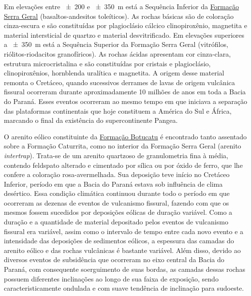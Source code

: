 \def\serrageral{\href{http://pt.wikipedia.org/wiki/Forma\%C3\%A7\%C3\%A3o_Serra_Geral}{Formação Serra Geral}}

Em elevações entre \num{\pm200} e \SI{\pm350}{\metre} está a Sequência Inferior da \serrageral{} 
(basaltos-andesitos toleíticos). As rochas básicas são de coloração cinza-escura e são constituídas por 
plagioclásio cálcico clinopiroxênio, magnetita e material intersticial de quartzo e material desvitrificado. 
Em elevações superiores a \SI{\pm350}{\metre} está a Sequência Superior da Formação Serra Geral (vitrófilos, 
riólitos-riodacitos granofíricos). As rochas ácidas apresentam cor cinza-clara, estrutura microcristalina e 
são constituídas por cristais e plagioclásio, clinopiroxênios, hornblenda uralítica e magnetita. A origem 
desse material remonta o Cretáceo, quando sucessivos derrames de lavas de origem vulcânica fissural ocorreram 
durante aproximadamente \num{10} milhões de anos em toda a Bacia do Paraná. Esses eventos ocorreram ao mesmo 
tempo em que iniciava a separação das plataformas continentais que hoje constituem a América do Sul e África, 
marcando o final da existência do supercontinente Pangea.

\def\botucatu{\href{http://pt.wikipedia.org/wiki/Forma\%C3\%A7\%C3\%A3o_Botucatu}{Formação Botucatu}}

O arenito eólico constituinte da \botucatu{} é encontrado tanto assentado sobre a Formação Caturrita, como no 
interior da Formação Serra Geral (arenito \emph{intertrap}). Trata-se de um arenito quartzoso de granulometria 
fina à média, contendo feldspato alterado e cimentado por sílica ou por óxido de ferro, que lhe confere a 
coloração rosa-avermelhada. Sua deposição teve início no Cretáceo Inferior, período em que a Bacia do Paraná 
estava sob influência de clima desértico. Essa condição climática continuou durante todo o período em que 
ocorreram as dezenas de eventos de vulcanismo fissural, fazendo com que os mesmos fossem sucedidos por 
deposições eólicas de duração variável. Como a duração e a quantidade de material depositado pelos eventos de 
vulcanismo fissural era variável, assim como o intervalo de tempo entre cada novo evento e a intensidade das 
deposições de sedimentos eólicos, a espessura das camadas do arenito eólico e das rochas vulcânicas é bastante 
variável. Além disso, devido ao diversos eventos de subsidência que ocorreram no eixo central da Bacia do 
Paraná, com consequente soerguimento de suas bordas, as camadas dessas rochas possuem diferentes inclinações 
ao longo de sua faixa de exposição, sendo caracteristicamente ondulada e com suave tendência de inclinação 
para sudoeste.

